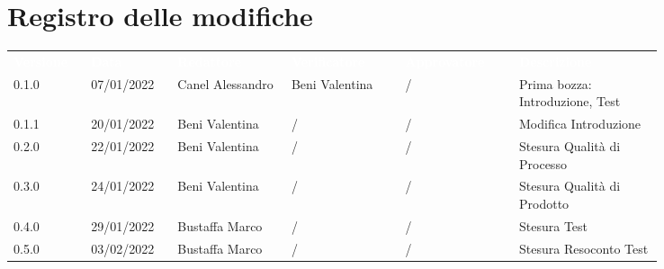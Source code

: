 \section*{Registro delle modifiche}

{\renewcommand{\arraystretch}{1.5}
\scriptsize
\begin{tabular}{p{0.10\linewidth}p{0.10\linewidth}p{0.15\linewidth}p{0.15\linewidth}p{0.15\linewidth}p{0.19\linewidth}}
	\rowcolor[RGB]{33, 73, 50}
	\textcolor{white}{\textbf{Versione}} & \textcolor{white}{\textbf{Data}} &
	\textcolor{white}{\textbf{Redattore}} & \textcolor{white}{\textbf{Verificatore}} &
	\textcolor{white}{\textbf{Approvatore}} & \textcolor{white}{\textbf{Descrizione}}\\
	\rowcolor[RGB]{216, 235, 171}
	0.1.0 & 07/01/2022 & Canel Alessandro& Beni Valentina &/& Prima bozza: Introduzione, Test\\
	\rowcolor[RGB]{233, 245, 206}
	0.1.1 & 20/01/2022 & Beni Valentina& / &/& Modifica Introduzione\\
	\rowcolor[RGB]{216, 235, 171}
	0.2.0 & 22/01/2022 & Beni Valentina& / &/& Stesura Qualità di Processo\\
	\rowcolor[RGB]{233, 245, 206}
	0.3.0 & 24/01/2022 & Beni Valentina& / &/& Stesura Qualità di Prodotto\\
	\rowcolor[RGB]{216, 235, 171}
	0.4.0 & 29/01/2022 & Bustaffa Marco& / &/& Stesura Test\\
	\rowcolor[RGB]{233, 245, 206}
	0.5.0 & 03/02/2022 & Bustaffa Marco& / &/& Stesura Resoconto Test\\
\end{tabular}
}
